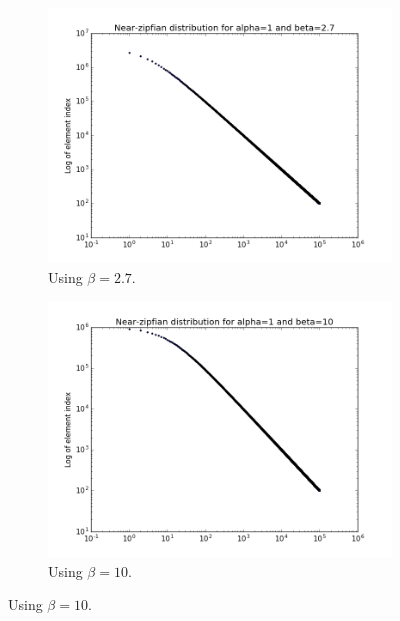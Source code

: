 \begin{figure}[ht]
    \centering
    \begin{subfigure}{0.475\textwidth}
    \centering
    \includegraphics[width=0.9\linewidth]{Cap2/zipf27}
    \caption{Using \(\beta = 2.7\).}
    \label{fig:zipf27}
    \end{subfigure}
    \begin{subfigure}{0.475\textwidth}
    \centering
    \includegraphics[width=0.9\linewidth]{Cap2/zipf10}
    \caption{Using \(\beta = 10\).}
    \label{fig:zipf10}
    \end{subfigure}
    

\end{figure}
